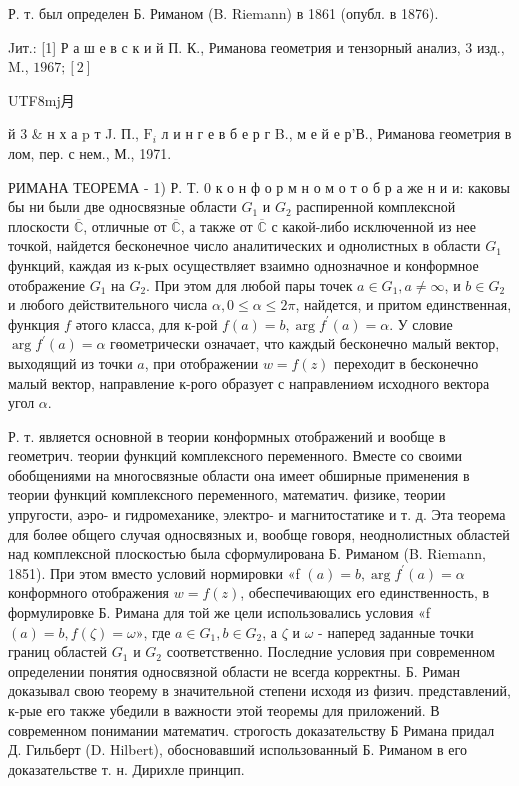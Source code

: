 \documentclass[10pt]{article}
\begin{document}
Р. т. был определен Б. Риманом (B. Riemann) в 1861 (опубл. в 1876).



Jит.: [1] Р а ш е в с к и й П. К., Риманова геометрия и тензорный анализ, 3 изд., M., $1967 ;[2]$ \begin{CJK}{UTF8}{mj}月\end{CJK}й 3 \& н х а p т J. П., $\mathrm{F}_{i}$ л и н г е в б е р г B., м е й е р'В., Риманова геометрия в лом, пер. с нем., М., 1971.



РИМАНА ТЕОРЕМА - 1) Р. Т. 0 к о н ф о р м н о м о т о б р а же н и и: каковы бы ни были две односвязные области $G_{1}$ и $G_{2}$ распиренной комплексной плоскости $\overline{\mathbb{C}}$, отличные от $\overline{\mathbb{C}}$, а также от $\overline{\mathbb{C}}$ с какой-либо исключенной из нее точкой, найдется бесконечное число аналитических и однолистных в области $G_{1}$ функций, каждая из к-рых осуществляет взаимно однозначное и конформное отображение $G_{1}$ на $G_{2}$. При этом для любой пары точек $a \in G_{1}, a \neq \infty$, и $b \in G_{2}$ и любого действительного числа $\alpha, 0 \leqslant \alpha \leqslant 2 \pi$, найдется, и притом единственная, функция $f$ әтого класса, для к-рой $f(a)=b, \arg f^{\prime}(a)=\alpha$. У словие $\arg f^{\prime}(a)=\alpha$ гөометрически означает, что каждый бесконечно малый вектор, выходящий из точки $a$, при отображении $w=f(z)$ переходит в бесконечно малый вектор, направление к-рого образует с направлениөм исходного вектора угол $\alpha$.



Р. т. является основной в теории конформных отображений и вообще в геометрич. теории функций комплексного переменного. Вместе со своими обобщениями на многосвязные области она имеет обширные применения в теории функций комплексного переменного, математич. физике, теории упругости, аэро- и гидромеханике, электро- и магнитостатике и т. д. Эта теорема для болөе общего случая односвязных и, вообще говоря, неоднолистных областей над комплексной плоскостью была сформулирована Б. Риманом (B. Riemann, 1851). При этом вместо условий нормировки «f $(a)=b, \arg f^{\prime}(a)=\alpha$ конформного отображения $w=f(z)$, обеспечивающих его единственность, в формулировке Б. Римана для той же цели использовались условия «f $(a)=b, f(\zeta)=\omega »$, где $a \in G_{1}, b \in G_{2}$, а $\zeta$ и $\omega$ - наперед заданные точки границ областей $G_{1}$ и $G_{2}$ соответственно. Последние условия при современном определении понятия односвязной области не всегда корректны. Б. Риман доказывал свою теорему в значительной степени исходя из физич. представлений, к-рые его также убедили в важности этой теоремы для приложений. В современном понимании математич. строгость доказательству Б Римана придал Д. Гильберт (D. Hilbert), обосновавший использованный Б. Риманом в его доказательстве т. н. Дирихле принцип.
\end{document}
